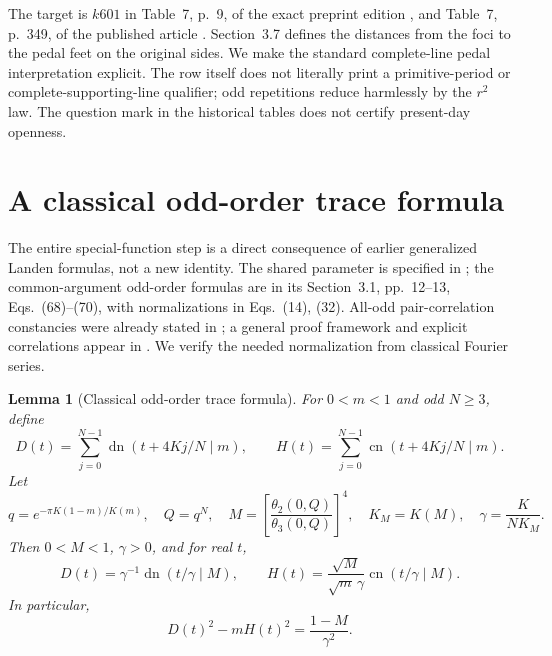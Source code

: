 \documentclass[11pt]{article}
\newcommand{\cn}{\operatorname{cn}}
\newcommand{\dn}{\operatorname{dn}}
\newtheorem{lemma}[theorem]{Lemma}
\begin{document}
The target is \(k601\) in Table~7, p.~9, of the exact preprint edition
\cite{RGKpre}, and Table~7, p.~349, of the published article \cite{RGK}.
Section~3.7 defines the distances from the foci to the pedal feet on
the original sides. We make the standard complete-line pedal
interpretation explicit. The row itself does not literally print
a primitive-period or complete-supporting-line qualifier; odd
repetitions reduce harmlessly by the \(r^2\) law. The question mark in
the historical tables does not certify present-day openness.

\section{A classical odd-order trace formula}

The entire special-function step is a direct consequence of earlier
generalized Landen formulas, not a new identity. The shared parameter is specified in \cite[Eq.~(53)]{KSlanden};
the common-argument odd-order formulas are in its Section~3.1,
pp.~12--13, Eqs.~(68)--(70), with normalizations in Eqs.~(14), (32).
All-odd pair-correlation constancies were already stated in
\cite[Table~1, Eq.~(29)]{KScyclic}; a general proof framework and
explicit correlations appear in \cite[Sections~1--2 and
Appendix~A]{KLScyclic}. We verify the needed normalization from
classical Fourier series.

\begin{lemma}[Classical odd-order trace formula]\label{lem:trace}
For \(0<m<1\) and odd \(N\geq3\), define
\[
 D(t)=\sum_{j=0}^{N-1}\dn(t+4Kj/N\mid m),\qquad
 H(t)=\sum_{j=0}^{N-1}\cn(t+4Kj/N\mid m).
\]
Let
\[
 q=e^{-\pi K(1-m)/K(m)},\quad Q=q^N,\quad
 M=\left[\frac{\theta_2(0,Q)}{\theta_3(0,Q)}\right]^4,\quad
 K_M=K(M),\quad \gamma=\frac K{NK_M}.
\]
Then \(0<M<1\), \(\gamma>0\), and for real \(t\),
\begin{equation}\label{eq:traces}
 D(t)=\gamma^{-1}\dn(t/\gamma\mid M),\qquad
 H(t)=\frac{\sqrt M}{\sqrt m\,\gamma}\cn(t/\gamma\mid M).
\end{equation}
In particular,
\begin{equation}\label{eq:lorentz}
 D(t)^2-mH(t)^2=\frac{1-M}{\gamma^2}.
\end{equation}
\end{lemma}
\end{document}
